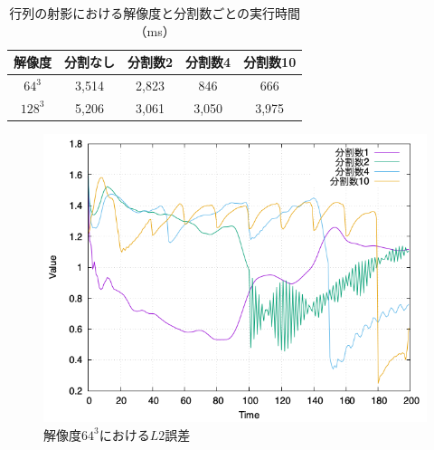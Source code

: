 \documentclass[a4j,12pt]{jreport}
\begin{document}
\begin {table}[htbp]
    \centering
  \caption{行列の射影における解像度と分割数ごとの実行時間（ms）}
  \label{tab:projection}
  \begin {tabular}{ccccc} \hline
    解像度 					&分割なし 		&分割数2			&分割数4 		&分割数10\\ \hline
    $64^3$ 					& 3,514 			&2,823	 		&846	 		&666\\
    $128^3$ 				& 5,206 			& 3,061 			& 3,050 		&3,975\\ \hline
  \end {tabular}
\end {table}



\begin{figure}[htbp]
\includegraphics[width=140mm]{images/64error.png}
\caption{$解像度64^3におけるL2誤差$}
\label{fig:64error}
\end{figure}
\end{document}
